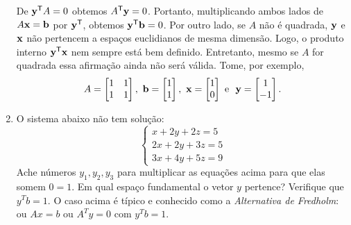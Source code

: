 \documentclass[leqno]{article}
\begin{document}
\begin{enumerate}
\begin{sol}
    De \( \mathbf{y}^{ \mathsf{T} } A = 0 \) obtemos \( A^{ \mathsf{T} } \mathbf{y} = 0 \).
    Portanto, multiplicando ambos lados de \( A \mathbf{x} = \mathbf{b} \) por \( \mathbf{y}^{ \mathsf{T} } \), obtemos \( \mathbf{y}^{ \mathsf{T} } \mathbf{b} = 0 \).
    Por outro lado, se \( A \) não é quadrada, \( \mathbf{y} \) e \( \mathbf{x} \) não pertencem a espaços euclidianos de mesma dimensão.
    Logo, o produto interno \( \mathbf{y}^{ \mathsf{T} } \mathbf{x} \) nem sempre está bem definido.
    Entretanto, mesmo se \( A \) for quadrada essa afirmação ainda não será válida.
    Tome, por exemplo,
    \begin{equation*}
        A =
        \begin{bmatrix}
            1 & 1 \\
            1 & 1
        \end{bmatrix}, \
        \mathbf{b} =
        \begin{bmatrix}
            1 \\
            1
        \end{bmatrix}, \
        \mathbf{x} =
        \begin{bmatrix}
            1 \\
            0
        \end{bmatrix} \text{ e } \
        \mathbf{y} =
        \begin{bmatrix}
            1 \\
            -1
        \end{bmatrix}
    .\end{equation*}

\end{sol} 



\item O sistema abaixo não tem solução:
$$\begin{cases}
x + 2y + 2z = 5\\
2x + 2y + 3z = 5\\
3x + 4y + 5z = 9
\end{cases}$$
Ache números $y_1,y_2,y_3$ para multiplicar as equações acima para que elas somem $0=1$. Em qual espaço fundamental o vetor $y$ pertence? Verifique que $y^Tb = 1$. O caso acima é típico e conhecido como a \textit{Alternativa de Fredholm}: ou $Ax = b$ ou $A^Ty = 0$ com $y^Tb = 1$.

\begin{sol} 


\end{sol}
\end{enumerate}
\end{document}
